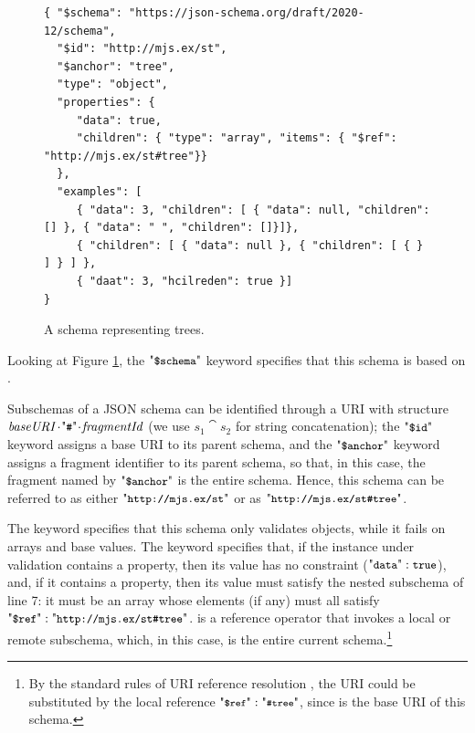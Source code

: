 \begin{figure}[htb!]
\begin{querybox}{}
\begin{lstlisting}[style=query,escapechar=Z]
{ "$schema": "https://json-schema.org/draft/2020-12/schema",
  "$id": "http://mjs.ex/st",
  "$anchor": "tree",
  "type": "object",
  "properties": {
     "data": true,
     "children": { "type": "array", "items": { "$ref": "http://mjs.ex/st#tree"}}
  },
  "examples": [
     { "data": 3, "children": [ { "data": null, "children": [] }, { "data": " ", "children": []}]},
     { "children": [ { "data": null }, { "children": [ { } ] } ] },
     { "daat": 3, "hcilreden": true }]
}
\end{lstlisting}
\end{querybox}
\caption{A schema representing trees.}
\label{fig1}
\end{figure}



Looking at Figure \ref{fig1}, the $\qdschema$ keyword specifies that this schema is based on {\DTwenty}.

Subschemas of a JSON schema can be identified through a URI with structure $\key{baseURI}\catHash\key{fragmentId}$
(we use $s_1\cat s_2$ for string concatenation);
the $\qdid$ keyword assigns a base URI to its parent schema, and the $\qda$ keyword assigns a fragment identifier to
its parent schema, so that, in this case, the fragment named  by $\qda$ is the entire schema. Hence, this schema can be referred to as either
$\qkw{http://mjs.ex/st}$ or as $\qkw{http://mjs.ex/st\#tree}$.

The {\qtype} keyword specifies that this schema only validates objects, while it fails on 
arrays and base values.
The {\qprops} keyword specifies that, if the instance under validation contains a  property, then its value has no constraint 
($\qkw{data}: \atrue$),
and, if it contains a  property, then its value must satisfy the nested subschema of line 7: it must
be an array whose elements (if any) must all satisfy 
$\qdref: \qkw{http://mjs.ex/st\#tree}$.
{\qdref} is a reference operator that invokes a local or remote subschema, which, in this case, is the entire current 
schema.\footnote{%
By the standard rules of URI reference resolution \citep{RFC3986}, the URI  
could be substituted by the local reference $\qkw{\footnotesize \$ref}: \qkw{\footnotesize\#tree}$, since  is the 
base URI of this schema.}


